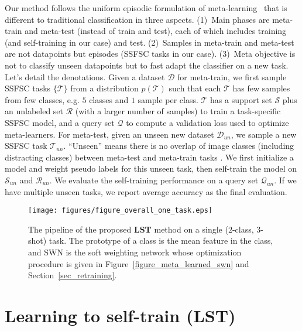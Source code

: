 \documentclass{article}
\begin{document}
Our method follows the uniform episodic formulation of meta-learning~\cite{VinyalsBLKW16} that is different to traditional classification in three aspects. (1)~Main phases are meta-train and meta-test (instead of train and test), each of which includes training (and
self-training in our case) and test. (2)~Samples in meta-train and meta-test are not datapoints but episodes (SSFSC tasks in our case). (3)~Meta objective is not to classify unseen datapoints but to fast adapt the classifier on a new task. 
Let's detail the denotations. 
Given a dataset $\mathcal{D}$ for meta-train, we first sample SSFSC tasks $\{\mathcal{T}\}$ from a distribution $p(\mathcal{T})$ such that each $\mathcal{T}$ has few samples from few classes, e.g. $5$ classes and $1$ sample per class. 
$\mathcal{T}$ has a support set $\mathcal{S}$ plus an unlabeled set $\mathcal{R}$ (with a larger number of samples) to train a task-specific SSFSC model, and a query set $\mathcal{Q}$ to compute a validation loss used to optimize meta-learners.
For meta-test, given an unseen new dataset $\mathcal{D}_{un}$, we sample a new SSFSC task $\mathcal{T}_{un}$. ``Unseen'' means there is no overlap of image classes (including distracting classes) between meta-test and meta-train tasks . We first initialize a model and weight pseudo labels for this unseen task, then self-train the model on $\mathcal{S}_{un}$ and $\mathcal{R}_{un}$.
We evaluate the self-training performance on a query set $\mathcal{Q}_{un}$. 
If we have multiple unseen tasks, we report average accuracy as the final evaluation.








\begin{figure*}[t]
  \centering
  \texttt{[image: figures/figure\_overall\_one\_task.eps]}
     \caption{The pipeline of the proposed \textbf{LST} method on a single ($2$-class, $3$-shot) task. 
     The prototype of a class is the mean feature in the class, and SWN is the soft weighting network whose optimization procedure is given in Figure~\ref{figure_meta_learned_swn} and Section~\ref{sec_retraining}.}
  \label{figure_overall_one_task}
  \vspace{-4mm}
\end{figure*}
 

\section{Learning to self-train (LST)}
\end{document}
